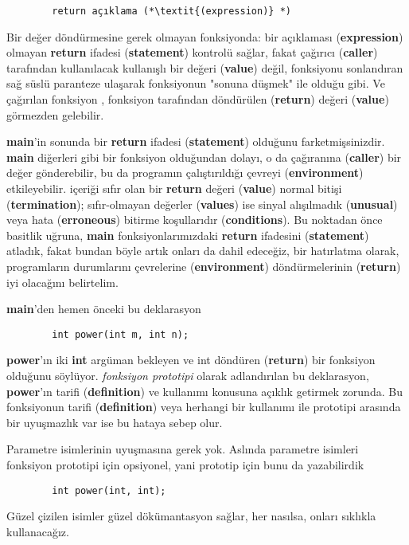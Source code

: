 \documentclass[a4paper,12pt,oneside]{book}
\begin{document}
\begin{lstlisting}
		return açıklama (*\textit{(expression)} *)
\end{lstlisting}
Bir değer döndürmesine gerek olmayan fonksiyonda: bir açıklaması (\textbf{expression}) olmayan \textbf{return} ifadesi (\textbf{statement}) kontrolü sağlar, fakat çağırıcı (\textbf{caller}) tarafından kullanılacak kullanışlı bir değeri (\textbf{value}) değil, fonksiyonu  sonlandıran sağ süslü paranteze ulaşarak fonksiyonun  "sonuna düşmek" ile olduğu gibi. Ve çağırılan fonksiyon , fonksiyon  tarafından döndürülen (\textbf{return}) değeri (\textbf{value}) görmezden gelebilir.
\par \textbf{main}'in sonunda bir \textbf{return} ifadesi (\textbf{statement}) olduğunu farketmişsinizdir.  \textbf{main} diğerleri gibi bir fonksiyon  olduğundan dolayı, o da çağıranına (\textbf{caller}) bir değer gönderebilir, bu da programın çalıştırıldığı çevreyi (\textbf{environment}) etkileyebilir. içeriği sıfır olan bir \textbf{return} değeri (\textbf{value}) normal bitişi (\textbf{termination}); sıfır-olmayan değerler (\textbf{values}) ise sinyal alışılmadık (\textbf{unusual}) veya hata (\textbf{erroneous}) bitirme koşullarıdır (\textbf{conditions}). Bu noktadan önce basitlik uğruna, \textbf{main} fonksiyonlarımızdaki  \textbf{return} ifadesini (\textbf{statement}) atladık, fakat bundan böyle artık onları da dahil edeceğiz, bir hatırlatma olarak, programların durumlarını çevrelerine (\textbf{environment}) döndürmelerinin (\textbf{return}) iyi olacağını belirtelim.
\par \textbf{main}'den hemen önceki bu deklarasyon
\begin{lstlisting}
		int power(int m, int n);
\end{lstlisting}
\textbf{power}'ın iki \textbf{int} argüman bekleyen ve int döndüren (\textbf{return}) bir fonksiyon  olduğunu söylüyor. \textit{fonksiyon prototipi} olarak adlandırılan bu deklarasyon, \textbf{power}'ın tarifi (\textbf{definition}) ve kullanımı konusuna açıklık getirmek zorunda. Bu fonksiyonun  tarifi (\textbf{definition})  veya herhangi bir kullanımı ile prototipi arasında bir uyuşmazlık var ise bu hataya sebep olur.
\par Parametre isimlerinin uyuşmasına gerek yok. Aslında parametre isimleri fonksiyon prototipi için opsiyonel, yani prototip için bunu da yazabilirdik
\begin{lstlisting}
		int power(int, int);
\end{lstlisting}
Güzel çizilen isimler güzel dökümantasyon sağlar, her nasılsa, onları sıklıkla kullanacağız.
\end{document}
